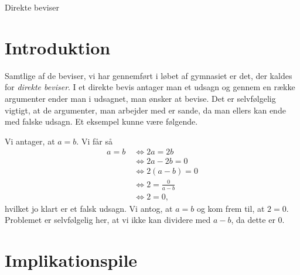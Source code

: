 \begin{center}
\Huge
Direkte beviser
\end{center}

\section*{Introduktion}

Samtlige af de beviser, vi har gennemført i løbet af gymnasiet er det, der kaldes for \textit{direkte beviser}. I et direkte bevis antager man et udsagn og gennem en række argumenter ender man i udsagnet, man ønsker at bevise. Det er selvfølgelig vigtigt, at de argumenter, man arbejder med er sande, da man ellers kan ende med falske udsagn. Et eksempel kunne være følgende. 

\begin{exa}
	Vi antager, at $a = b$. Vi får så
	\begin{align*}
		a = b \ &\Leftrightarrow 2a = 2b\\
		&\Leftrightarrow	2a - 2b = 0 \\
		&\Leftrightarrow 2(a-b) = 0 \\
		&\Leftrightarrow	 2 = \frac{0}{a-b} \\
		&\Leftrightarrow 2 = 0,
	\end{align*}
	hvilket jo klart er et falsk udsagn. Vi antog, at $a = b$ og kom frem til, at $2 = 0$. Problemet er selvfølgelig
	her, at vi ikke kan dividere med $a - b$, da dette er 0. 
\end{exa}

\section*{Implikationspile}

